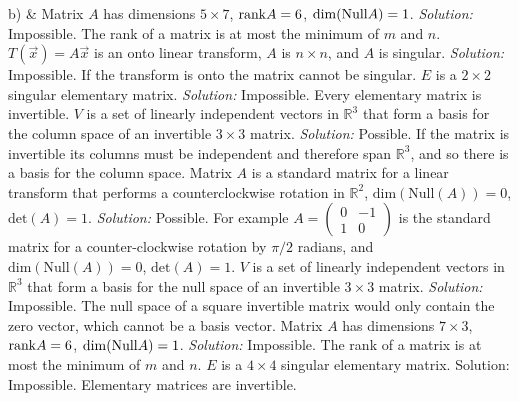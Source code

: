 b) &  
\ifnum {}         
    Matrix $A$ has dimensions $5\times7$, $\text{rank} A = 6$, $\dim(\text{Null} A) = 1$. 
    \ifnum {} {\color{DarkBlue} \textit{Solution:  } Impossible. The rank of a matrix is at most the minimum of $m$ and $n$.  } \fi
\fi
\ifnum {}      
    $T(\vec x) = A\vec x$ is an onto linear transform, $A$ is $n\times n$, and $A$ is singular.
    \ifnum {} {\color{DarkBlue} \textit{Solution:  } Impossible. If the transform is onto the matrix cannot be singular.  } \fi
\fi    
\ifnum {}  
    $E$ is a $2\times 2$ singular elementary matrix. 
    \ifnum {} {\color{DarkBlue} \textit{Solution:  } Impossible. Every elementary matrix is invertible. } \fi
\fi    
\ifnum {}    
    $V$ is a set of linearly independent vectors in $\mathbb R^3$ that form a basis for the column space of an invertible $3\times3$ matrix.
    \ifnum {} {\color{DarkBlue} \textit{Solution:  } Possible. If the matrix is invertible its columns must be independent and therefore span $\mathbb R^3$, and so there is a basis for the column space. } \fi
\fi   
\ifnum {}    
    Matrix $A$ is a standard matrix for a linear transform that performs a counterclockwise rotation in $\mathbb R^2$, $\text{dim}(\text{Null}(A))=0$, $\text{det}(A)=1$. 
    \ifnum {} {\color{DarkBlue} \textit{Solution:  } Possible. For example \setlength{\extrarowheight}{0.00cm}  $A = \begin{pmatrix} 0&-1\\1&0\end{pmatrix}$ is the standard matrix for a counter-clockwise rotation by $\pi/2$ radians, and $\text{dim}(\text{Null}(A))=0$, $\text{det}(A)=1$.  } \fi
\fi    
\ifnum {}      
    $V$ is a set of linearly independent vectors in $\mathbb R^3$ that form a basis for the null space of an invertible $3\times3$ matrix.
    \ifnum {} {\color{DarkBlue} \textit{Solution:  } Impossible. The null space of a square invertible matrix would only contain the zero vector, which cannot be a basis vector.  } \fi
\fi        
\ifnum {}  
    Matrix $A$ has dimensions $7\times3$, $\text{rank} A = 6$, $\dim(\text{Null} A) = 1$. 
    \ifnum {} {\color{DarkBlue} \textit{Solution:  } Impossible. The rank of a matrix is at most the minimum of $m$ and $n$.  }  \fi
\fi      
\ifnum {}
    $E$ is a $4\times 4$  singular elementary matrix. 
    \ifnum {} {\color{DarkBlue} Solution:  Impossible. Elementary matrices are invertible. 
    } \fi
\fi      
\ifnum {}
    \setlength{\extrarowheight}{0.00cm} 
